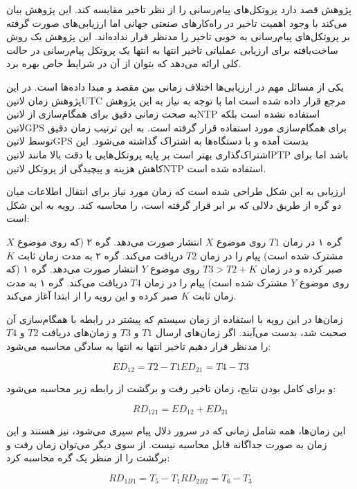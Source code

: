
پژوهش  قصد دارد پروتکل‌های پیام‌رسانی را از نظر تاخیر مقایسه کند. این پژوهش بیان می‌کند با وجود اهمیت تاخیر در راه‌کارهای صنعتی جهانی اما ارزیابی‌های صورت گرفته بر
پروتکل‌های پیام‌رسانی به خوبی تاخیر را مدنظر قرار نداده‌اند. این پژوهش یک روش ساخت‌یافته برای ارزیابی عملیاتی تاخیر انتها به انتها یک پروتکل پیام‌رسانی در حالت کلی ارائه می‌دهد که بتوان از آن
در شرایط خاص بهره برد.

یکی از مسائل مهم در ارزیابی‌ها اختلاف زمانی بین مقصد و مبدا داده‌ها است. در این پژوهش زمان ‌لاتین{UTC} مرجع قرار داده شده است اما با توجه به نیاز به این پژوهش به صحت زمانی دقیق
برای همگام‌سازی از ‌لاتین{NTP} استفاده نشده است بلکه ‌لاتین{GPS} برای همگام‌سازی مورد استفاده قرار گرفته است.
به این ترتیب زمان دقیق توسط ‌لاتین{GPS} بدست آمده و با دستگاه‌ها به اشتراک گذاشته می‌شود. این اشتراک‌گذاری بهتر است بر پایه پروتکل‌هایی با دقت بالا مانند ‌لاتین{PTP} باشد اما
برای کاهش هزینه و پیچیدگی از پروتکل ‌لاتین{NTP} استفاده شده است.

ارزیابی به این شکل طراحی شده است که زمان مورد نیاز برای انتقال اطلاعات میان دو گره از طریق دلالی که بر ابر قرار گرفته است، را محاسبه کند.
رویه به این شکل است:

 گره ۱ در زمان $T1$ روی موضوع $X$ انتشار صورت می‌دهد.
 گره ۲ (که روی موضوع $X$ مشترک شده است) پیام را در زمان $T2$ دریافت می‌کند.
 گره ۲ به مدت زمان ثابت $K$ صبر کرده و در زمان $T3>T2+K$ روی موضوع $Y$ انتشار صورت می‌دهد.
 گره ۱ (که روی موضوع $Y$ مشترک شده است) پیام را در زمان $T4$ دریافت می‌کند.
 گره ۱ به مدت زمان ثابت $K$ صبر کرده و این رویه را از ابتدا آغاز می‌کند.

زمان‌ها در این رویه با استفاده از زمان سیستم که پیشتر در رابطه با همگام‌سازی آن صحبت شد، بدست می‌آیند.
اگر زمان‌های ارسال $T1$ و $T3$ و زمان‌های دریافت $T2$ و $T4$ را مدنظر قرار دهیم تاخیر انتها به انتها به سادگی محاسبه می‌شود:

\[
  ED_{12} = T2 - T1
  ED_{21} = T4 - T3
\]

و برای کامل بودن نتایج، زمان تاخیر رفت و برگشت از رابطه زیر محاسبه می‌شود:

\[
  RD_{121} = ED_{12} + ED_{21}
\]

این زمان‌ها، همه شامل زمانی که در سرور دلال پیام سپری می‌شود، نیز هستند و این زمان به صورت جداگانه قابل محاسبه نیست.
از سوی دیگر می‌توان زمان رفت و برگشت را از منظر یک گره محاسبه کرد:

\[
  RD_{1B1} = T_{5} - T_{1}
  RD_{2B2} = T_{6} - T_{3}
\]

